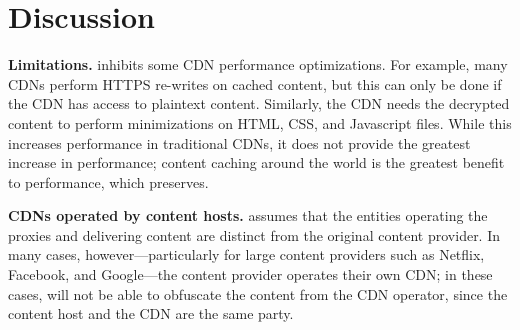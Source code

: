 \section{Discussion}
\label{sec:discussion}


\textbf{Limitations.} \system{} inhibits some CDN performance optimizations.  For
example,
many CDNs perform HTTPS re-writes on cached content, but this can only be 
done if the CDN has access to plaintext content.  Similarly, the CDN needs the 
decrypted content to perform minimizations on HTML, CSS, and Javascript files.  While 
this increases performance in traditional CDNs, it does not provide the greatest 
increase in performance; content caching around the world is the greatest benefit to 
performance, which \system{} preserves.

\textbf{CDNs operated by content hosts.} \system{}
assumes that the entities operating the proxies and delivering content are
distinct from the original content provider. In many cases, however---particularly
for large content providers such as Netflix, Facebook, and Google---the
content provider operates their own CDN; in these cases, \system{} will
not be able to obfuscate the content from the CDN operator, since the content host
and the CDN are the same party.  %


